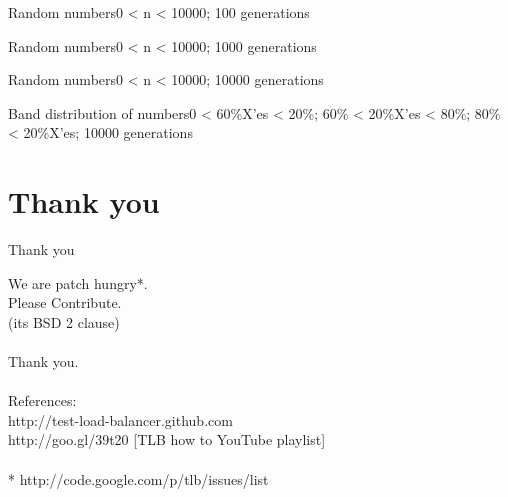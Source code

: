 \documentclass{beamer}
\begin{document}
\begin{frame}{Random numbers}{0 < n < 10000; 100 generations}
  \begin{centering}
  \end{centering}
\end{frame}

\begin{frame}{Random numbers}{0 < n < 10000; 1000 generations}
  \begin{centering}
  \end{centering}
\end{frame}

\begin{frame}{Random numbers}{0 < n < 10000; 10000 generations}
  \begin{centering}
  \end{centering}
\end{frame}

\begin{frame}{Band distribution of numbers}{0 < 60\%X'es < 20\%; 60\% < 20\%X'es < 80\%; 80\% < 20\%X'es; 10000 generations}
  \begin{centering}
  \end{centering}
\end{frame}

\section*{Thank you}

\begin{frame}{Thank you}
  \begin{centering}
  {\huge We are patch hungry*.\\Please Contribute.\\}
  (its BSD 2 clause)\\
  \quad\\
  {\huge Thank you.}\\
  \quad\\
  References:\\
  http://test-load-balancer.github.com
  \quad\\
  http://goo.gl/39t20 [{\color{blue}TLB how to} YouTube playlist]\\
  \quad\\
  * http://code.google.com/p/tlb/issues/list\\
  \end{centering}
\end{frame}
\end{document}
